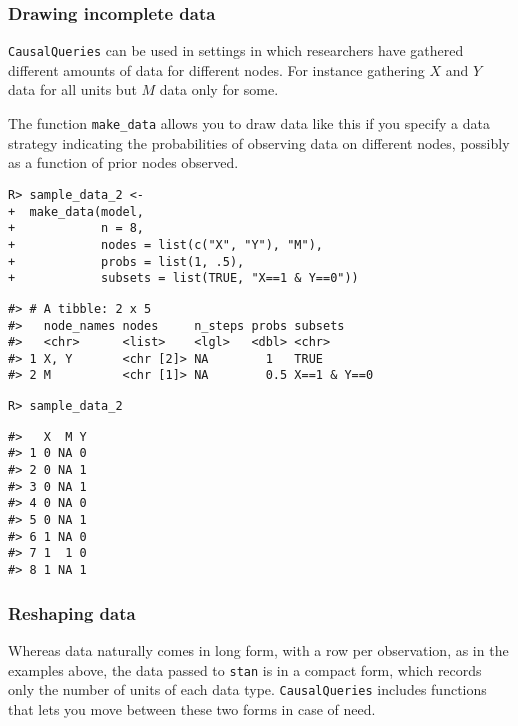 \documentclass[
  11pt,
  article]{jss}
\begin{document}
\hypertarget{drawing-incomplete-data}{%
\subsubsection{Drawing incomplete data}\label{drawing-incomplete-data}}

\texttt{CausalQueries} can be used in settings in which researchers have
gathered different amounts of data for different nodes. For instance
gathering \(X\) and \(Y\) data for all units but \(M\) data only for
some.

The function \texttt{make\_data} allows you to draw data like this if
you specify a data strategy indicating the probabilities of observing
data on different nodes, possibly as a function of prior nodes observed.

\begin{verbatim}
R> sample_data_2 <-
+  make_data(model,
+            n = 8,
+            nodes = list(c("X", "Y"), "M"),
+            probs = list(1, .5),
+            subsets = list(TRUE, "X==1 & Y==0"))
\end{verbatim}

\begin{verbatim}
#> # A tibble: 2 x 5
#>   node_names nodes     n_steps probs subsets    
#>   <chr>      <list>    <lgl>   <dbl> <chr>      
#> 1 X, Y       <chr [2]> NA        1   TRUE       
#> 2 M          <chr [1]> NA        0.5 X==1 & Y==0
\end{verbatim}

\begin{verbatim}
R> sample_data_2
\end{verbatim}

\begin{verbatim}
#>   X  M Y
#> 1 0 NA 0
#> 2 0 NA 1
#> 3 0 NA 1
#> 4 0 NA 0
#> 5 0 NA 1
#> 6 1 NA 0
#> 7 1  1 0
#> 8 1 NA 1
\end{verbatim}

\hypertarget{reshaping-data}{%
\subsubsection{Reshaping data}\label{reshaping-data}}

Whereas data naturally comes in long form, with a row per observation,
as in the examples above, the data passed to \texttt{stan} is in a
compact form, which records only the number of units of each data type.
\texttt{CausalQueries} includes functions that lets you move between
these two forms in case of need.
\end{document}
